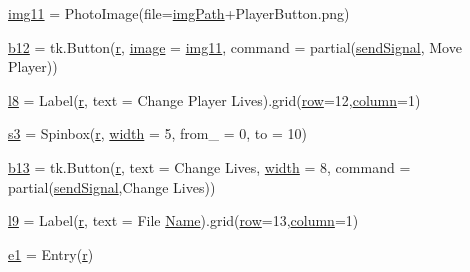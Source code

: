 \begin{DoxyCompactItemize}
\mbox{\hyperlink{namespace_g_u_i_a54eba3e54367f4dc592947bf19468e7f}{img11}} = Photo\+Image(file=\mbox{\hyperlink{namespace_g_u_i_a293e22c0a27a45862ad50fcb8ed12f15}{img\+Path}}+\textquotesingle{}Player\+Button.\+png\textquotesingle{})
\item 
\mbox{\hyperlink{namespace_g_u_i_af2a2606c0440d1c893c60b4d6d4fbec5}{b12}} = tk.\+Button(\mbox{\hyperlink{_s_d_l__opengl_8h_a42ce7cdc612e53abee15043f80220d97}{r}}, \mbox{\hyperlink{_s_d_l__opengl_8h_a0a221b005894579fea3b9eb7bfc2ee71}{image}} = \mbox{\hyperlink{namespace_g_u_i_a54eba3e54367f4dc592947bf19468e7f}{img11}}, command = partial(\mbox{\hyperlink{namespace_g_u_i_ae82f740e6453cdd542b52ede1560c2c3}{send\+Signal}}, \textquotesingle{}Move Player\textquotesingle{}))
\item 
\mbox{\hyperlink{namespace_g_u_i_a66ff0e016573e1293d4bf6cc8e2238bd}{l8}} = Label(\mbox{\hyperlink{_s_d_l__opengl_8h_a42ce7cdc612e53abee15043f80220d97}{r}}, text = \textquotesingle{}Change Player Lives\textquotesingle{}).grid(\mbox{\hyperlink{_s_d_l__opengl__glext_8h_a90d3e7e4182a9630993f640fa0443b0b}{row}}=12,\mbox{\hyperlink{_s_d_l__opengl__glext_8h_a0027cf4871ca9857e8e241960701189f}{column}}=1)
\item 
\mbox{\hyperlink{namespace_g_u_i_a16b808fdebb02f1fb7304c7de82b9584}{s3}} = Spinbox(\mbox{\hyperlink{_s_d_l__opengl_8h_a42ce7cdc612e53abee15043f80220d97}{r}}, \mbox{\hyperlink{_s_d_l__opengl_8h_a9a82cf3caff84cabc4598e2619faac17}{width}} = 5, from\+\_\+ = 0, to = 10)
\item 
\mbox{\hyperlink{namespace_g_u_i_a70f8a6b3e40fa679f0be933103c4e3c1}{b13}} = tk.\+Button(\mbox{\hyperlink{_s_d_l__opengl_8h_a42ce7cdc612e53abee15043f80220d97}{r}}, text = \textquotesingle{}Change Lives\textquotesingle{}, \mbox{\hyperlink{_s_d_l__opengl_8h_a9a82cf3caff84cabc4598e2619faac17}{width}} = 8, command = partial(\mbox{\hyperlink{namespace_g_u_i_ae82f740e6453cdd542b52ede1560c2c3}{send\+Signal}},\textquotesingle{}Change Lives\textquotesingle{}))
\item 
\mbox{\hyperlink{namespace_g_u_i_a92765160ab69a02bcf2f7aa02a16aaa7}{l9}} = Label(\mbox{\hyperlink{_s_d_l__opengl_8h_a42ce7cdc612e53abee15043f80220d97}{r}}, text = \textquotesingle{}File \mbox{\hyperlink{_python-ast_8h_a3e9f22c154a65956ebd413d2d8dafc0f}{Name}}\textquotesingle{}).grid(\mbox{\hyperlink{_s_d_l__opengl__glext_8h_a90d3e7e4182a9630993f640fa0443b0b}{row}}=13,\mbox{\hyperlink{_s_d_l__opengl__glext_8h_a0027cf4871ca9857e8e241960701189f}{column}}=1)
\item 
\mbox{\hyperlink{namespace_g_u_i_af268557bd2f393a6fce1161af8ab0300}{e1}} = Entry(\mbox{\hyperlink{_s_d_l__opengl_8h_a42ce7cdc612e53abee15043f80220d97}{r}})

\end{DoxyCompactItemize}
